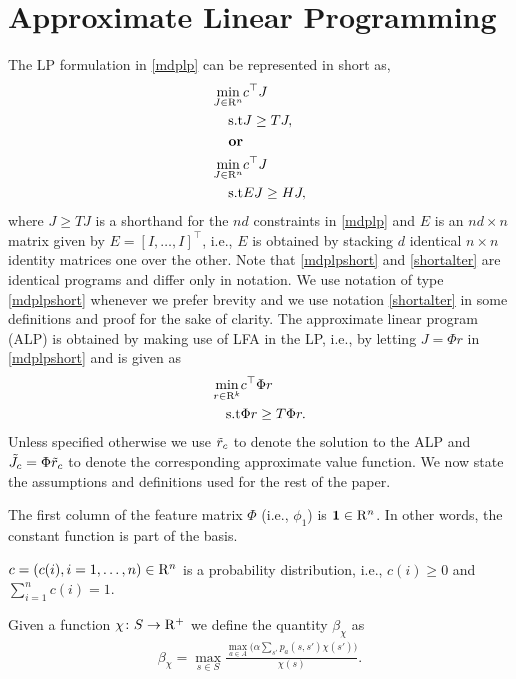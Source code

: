 \section{Approximate Linear Programming}
The LP formulation in \eqref{mdplp} can be represented in short as,
\begin{align}\label{mdplpshort}
\min_{J\in \R^n} &c^\top J\nn\\
\text{s.t}\mb &J\geq T J,\\
\textbf{or}\nn\\
\label{shortalter}
\min_{J\in \R^n} &c^\top J\nn\\
\text{s.t}\mb &EJ\geq H J,\\
\end{align}
where $J\geq TJ$ is a shorthand for the $nd$ constraints in \eqref{mdplp} and $E$ is an $nd\times n$ matrix given by $E=[I,\ldots,I]^\top$, i.e., $E$ is obtained by stacking $d$ identical $n\times n$ identity matrices one over the other. Note that \eqref{mdplpshort} and \eqref{shortalter} are identical programs and differ only in notation. We use notation of type \eqref{mdplpshort} whenever we prefer brevity and we use notation \eqref{shortalter} in some definitions and proof for the sake of clarity.
The approximate linear program (ALP) is obtained by making use of LFA in the LP, i.e., by letting $J=\Phi r$ in \eqref{mdplpshort} and is given as
\begin{align}\label{alp}
\min_{r\in \R^k} &c^\top \Phi r\nn\\
\text{s.t}\mb &\Phi r\geq T \Phi r.
\end{align}
Unless specified otherwise we use $\tilde{r}_c$ to denote the solution to the ALP and $\tilde{J}_c=\Phi \tilde{r}_c$ to denote the corresponding approximate value function. We now state the assumptions and definitions used for the rest of the paper.
\begin{assumption}\label{one}
The first column of the feature matrix $\Phi$ (i.e., $\phi_1$) is $\mathbf{1} \in \mathrm{R}^n$. In other words, the constant function is part of the basis.
\end{assumption}
\begin{assumption}\label{probdist}
$c=(c(i),i=1,\ldots,n)\in \mathrm{R}^n$ is a probability distribution, i.e., $c(i)\geq 0$ and $\sum_{i=1}^n c(i)=1$.
\end{assumption}
\begin{definition}
Given a function $\chi\colon S\rightarrow \mathrm{R}^+$ we define the quantity $\beta_{\chi}$ as
\begin{align}
\beta_{\chi}=\max_{s \in S} \frac{\underset{a \in A}{\max}\big(\alpha\sum_{s'}p_a(s,s')\chi(s')\big)}{\chi(s)}.
\end{align}
\end{definition}
